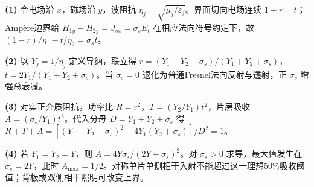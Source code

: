 \par\noindent\textbf{(1)} 令电场沿 \(x\)，磁场沿 \(y\)，波阻抗 \(\eta_j=\sqrt{\mu_j/\varepsilon_j}\)。界面切向电场连续 \(1+r=t\)；Ampère边界给 \(H_{1y}-H_{2y}=J_{sx}=\sigma_sE_t\) 在相应法向符号约定下，故 \((1-r)/\eta_1-t/\eta_2=\sigma_st\)。
\par\noindent\textbf{(2)} 以 \(Y_j=1/\eta_j\) 定义导纳，联立得 \(r=(Y_1-Y_2-\sigma_s)/(Y_1+Y_2+\sigma_s)\)，\(t=2Y_1/(Y_1+Y_2+\sigma_s)\)。当 \(\sigma_s=0\) 退化为普通Fresnel法向反射与透射，正 \(\sigma_s\) 增强总衰减。
\par\noindent\textbf{(3)} 对实正介质阻抗，功率比 \(R=r^2\)，\(T=(Y_2/Y_1)t^2\)，片层吸收 \(A=(\sigma_s/Y_1)t^2\)。代入分母 \(D=Y_1+Y_2+\sigma_s\) 得 \(R+T+A=[(Y_1-Y_2-\sigma_s)^2+4Y_1(Y_2+\sigma_s)]/D^2=1\)。
\par\noindent\textbf{(4)} 若 \(Y_1=Y_2=Y\)，则 \(A=4Y\sigma_s/(2Y+\sigma_s)^2\)。对 \(\sigma_s>0\) 求导，最大值发生在 \(\sigma_s=2Y\)，此时 \(A_{\max}=1/2\)。对称单片单侧相干入射不能超过这一理想50\%吸收阈值；背板或双侧相干照明可改变上界。
